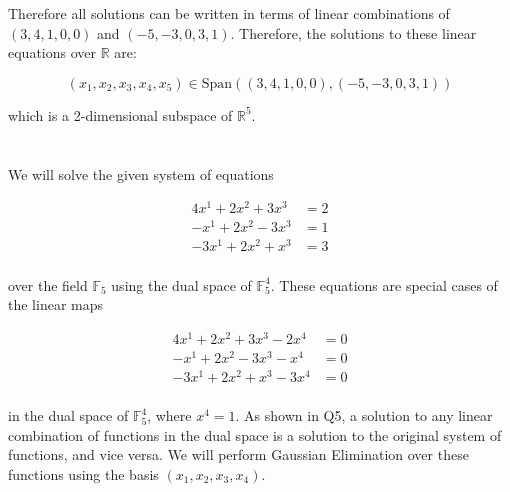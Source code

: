 \documentclass{article}
\newcommand{\R}{\mathbb{R}}
\newcommand{\F}{\mathbb{F}}
\begin{document}
Therefore all solutions can be written in terms of linear combinations of $(3, 4, 1, 0, 0)$ and $(-5, -3, 0, 3, 1)$. Therefore, the solutions to these linear equations over $\R$ are:

\[(x_1, x_2, x_3, x_4, x_5) \in \text{Span}((3, 4, 1, 0, 0), (-5, -3, 0, 3, 1))\]

which is a 2-dimensional subspace of $\R^5$.

\newpage
\section{}

We will solve the given system of equations

\begin{align*}
    4x^1 + 2x^2 + 3x^3 & = 2 \\
    -x^1 + 2x^2 - 3x^3 & = 1 \\
    -3x^1 + 2x^2 + x^3 & = 3 \\
\end{align*}

over the field $\F_5$ using the dual space of $\F_5^4$. These equations are special cases of the linear maps

\begin{align*}
    4x^1 + 2x^2 + 3x^3 - 2x^4 & = 0 \\
    -x^1 + 2x^2 - 3x^3 - x^4  & = 0 \\
    -3x^1 + 2x^2 + x^3 - 3x^4 & = 0 \\
\end{align*}

in the dual space of $\F_5^4$, where $x^4 = 1$. As shown in Q5, a solution to any linear combination of functions in the dual space is a solution to the original system of functions, and vice versa. We will perform Gaussian Elimination over these functions using the basis $(x_1, x_2, x_3, x_4)$.
\end{document}
